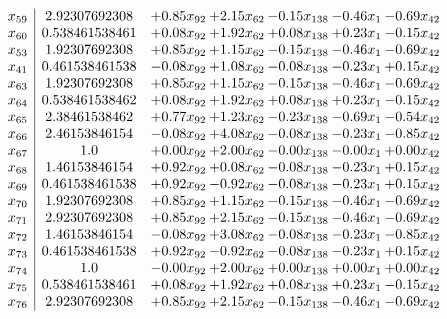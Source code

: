\documentclass[8pt]{article}
\begin{document}
\[\begin{array}{c| c c@{\hskip 2pt} c@{\hskip 2pt} c@{\hskip 2pt} c@{\hskip 2pt} c@{\hskip 2pt} }
 x_{59}   &  2.92307692308 & +  0.85 x_{92} & +  2.15 x_{62} & -0.15 x_{138} & -0.46 x_{1} & -0.69 x_{42}\\
 x_{60}   &  0.538461538461 & +  0.08 x_{92} & +  1.92 x_{62} & +  0.08 x_{138} & +  0.23 x_{1} & -0.15 x_{42}\\
 x_{53}   &  1.92307692308 & +  0.85 x_{92} & +  1.15 x_{62} & -0.15 x_{138} & -0.46 x_{1} & -0.69 x_{42}\\
 x_{41}   &  0.461538461538 & -0.08 x_{92} & +  1.08 x_{62} & -0.08 x_{138} & -0.23 x_{1} & +  0.15 x_{42}\\
 x_{63}   &  1.92307692308 & +  0.85 x_{92} & +  1.15 x_{62} & -0.15 x_{138} & -0.46 x_{1} & -0.69 x_{42}\\
 x_{64}   &  0.538461538462 & +  0.08 x_{92} & +  1.92 x_{62} & +  0.08 x_{138} & +  0.23 x_{1} & -0.15 x_{42}\\
 x_{65}   &  2.38461538462 & +  0.77 x_{92} & +  1.23 x_{62} & -0.23 x_{138} & -0.69 x_{1} & -0.54 x_{42}\\
 x_{66}   &  2.46153846154 & -0.08 x_{92} & +  4.08 x_{62} & -0.08 x_{138} & -0.23 x_{1} & -0.85 x_{42}\\
 x_{67}   &  1.0 & +  0.00 x_{92} & +  2.00 x_{62} & -0.00 x_{138} & -0.00 x_{1} & +  0.00 x_{42}\\
 x_{68}   &  1.46153846154 & +  0.92 x_{92} & +  0.08 x_{62} & -0.08 x_{138} & -0.23 x_{1} & +  0.15 x_{42}\\
 x_{69}   &  0.461538461538 & +  0.92 x_{92} & -0.92 x_{62} & -0.08 x_{138} & -0.23 x_{1} & +  0.15 x_{42}\\
 x_{70}   &  1.92307692308 & +  0.85 x_{92} & +  1.15 x_{62} & -0.15 x_{138} & -0.46 x_{1} & -0.69 x_{42}\\
 x_{71}   &  2.92307692308 & +  0.85 x_{92} & +  2.15 x_{62} & -0.15 x_{138} & -0.46 x_{1} & -0.69 x_{42}\\
 x_{72}   &  1.46153846154 & -0.08 x_{92} & +  3.08 x_{62} & -0.08 x_{138} & -0.23 x_{1} & -0.85 x_{42}\\
 x_{73}   &  0.461538461538 & +  0.92 x_{92} & -0.92 x_{62} & -0.08 x_{138} & -0.23 x_{1} & +  0.15 x_{42}\\
 x_{74}   &  1.0 & -0.00 x_{92} & +  2.00 x_{62} & +  0.00 x_{138} & +  0.00 x_{1} & +  0.00 x_{42}\\
 x_{75}   &  0.538461538461 & +  0.08 x_{92} & +  1.92 x_{62} & +  0.08 x_{138} & +  0.23 x_{1} & -0.15 x_{42}\\
 x_{76}   &  2.92307692308 & +  0.85 x_{92} & +  2.15 x_{62} & -0.15 x_{138} & -0.46 x_{1} & -0.69 x_{42}\\

\end{array}\]
\end{document}

